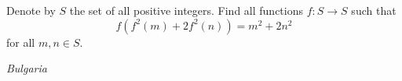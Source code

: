 Denote by $ S$ the set of all positive integers. Find all functions $ f: S \rightarrow S$ such that
\[ f (f^2(m) + 2f^2(n)) = m^2 + 2 n^2\]
for all $ m,n \in S$.

\textit{Bulgaria}